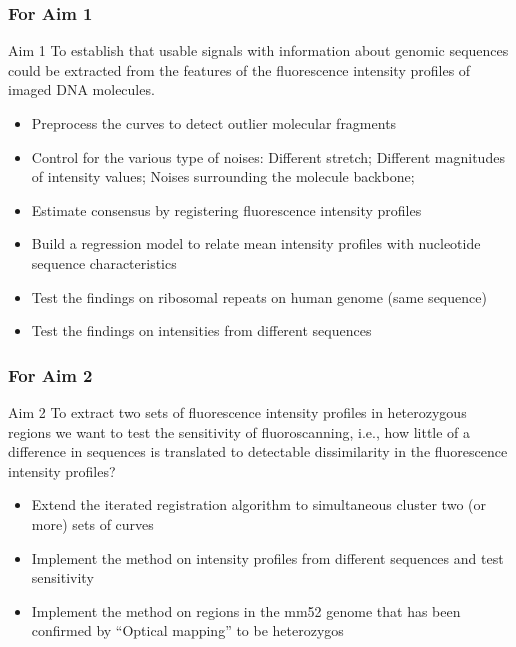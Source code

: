 \documentclass[10pt,dvipsnames,table]{beamer}
\begin{document}

\begin{frame}
\frametitle{For Aim 1}
\begin{block}{Aim 1}
To establish that usable signals with information about genomic sequences could be extracted from the features of the fluorescence intensity profiles of imaged DNA molecules.
\end{block}
\begin{itemize}
\item[\checkmark] Preprocess the curves to detect outlier molecular fragments
\item[\checkmark] Control for the various type of noises: Different stretch; Different magnitudes of intensity values; Noises surrounding the molecule backbone; 
\item[\checkmark] Estimate consensus by registering fluorescence intensity profiles
\item Build a regression model to relate mean intensity profiles with nucleotide sequence characteristics
\item Test the findings on ribosomal repeats on human genome (same sequence)
\item Test the findings on intensities from different sequences
\end{itemize}
\end{frame}

\begin{frame}
\frametitle{For Aim 2}
\begin{block}{Aim 2}
To extract two sets of fluorescence intensity profiles in heterozygous regions we want to test the sensitivity of fluoroscanning, i.e., how little of a difference in sequences is translated to detectable dissimilarity in the fluorescence intensity profiles?
\end{block}
\begin{itemize}
\item Extend the iterated registration algorithm to simultaneous cluster two (or more) sets of curves
\item Implement the method on intensity profiles from different sequences and test sensitivity
\item Implement the method on regions in the mm52 genome that has been confirmed by ``Optical mapping'' to be heterozygos
\end{itemize}
\end{frame}
\end{document}
